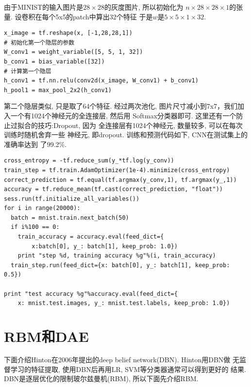 \documentclass{ctexart}
\begin{document}
由于MINIST的输入图片是\(28\times28\)的灰度图片, 所以初始化为
\(n\times28\times28\times1\)的张量. 设卷积在每个5x5的patch中算出32个特征
于是\(w\)是\(5\times5\times1\times32\).
\begin{lstlisting}
x_image = tf.reshape(x, [-1,28,28,1])
# 初始化第一个隐层的参数
W_conv1 = weight_variable([5, 5, 1, 32])
b_conv1 = bias_variable([32])
# 计算第一个隐层
h_conv1 = tf.nn.relu(conv2d(x_image, W_conv1) + b_conv1)
h_pool1 = max_pool_2x2(h_conv1)
\end{lstlisting}
第二个隐层类似, 只是取了64个特征. 经过两次池化,
图片尺寸减小到7x7，我们加入一个有1024个神经元的全连接层, 然后用
Softmax分类器即可. 这里还有一个防止过拟合的技巧:Dropout, 因为
全连接层有1024个神经元, 数量较多, 可以在每次训练时随机舍弃一些
神经元, 即dropout. 训练和预测代码如下, CNN在测试集上的准确率达到
了99.2\%.
\begin{lstlisting}
cross_entropy = -tf.reduce_sum(y_*tf.log(y_conv))
train_step = tf.train.AdamOptimizer(1e-4).minimize(cross_entropy)
correct_prediction = tf.equal(tf.argmax(y_conv,1), tf.argmax(y_,1))
accuracy = tf.reduce_mean(tf.cast(correct_prediction, "float"))
sess.run(tf.initialize_all_variables())
for i in range(20000):
  batch = mnist.train.next_batch(50)
  if i%100 == 0:
    train_accuracy = accuracy.eval(feed_dict={
        x:batch[0], y_: batch[1], keep_prob: 1.0})
    print "step %d, training accuracy %g"%(i, train_accuracy)
  train_step.run(feed_dict={x: batch[0], y_: batch[1], keep_prob: 0.5})

print "test accuracy %g"%accuracy.eval(feed_dict={
    x: mnist.test.images, y_: mnist.test.labels, keep_prob: 1.0})
\end{lstlisting}

\section{RBM和DAE}
下面介绍Hinton在2006年提出的deep belief network(DBN). Hinton用DBN做
无监督学习的特征提取, 使用DBN后再用LR, SVM等分类器通常可以得到更好的
结果. DBN是逐层优化的限制玻尔兹曼机(RBM), 所以下面先介绍RBM.
\end{document}
